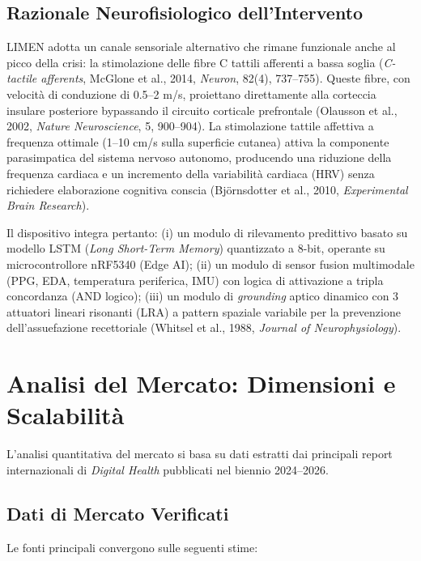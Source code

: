 \documentclass[12pt,a4paper]{article}
\begin{document}
\subsection{Razionale Neurofisiologico dell'Intervento}
LIMEN adotta un canale sensoriale alternativo che rimane funzionale anche al picco della crisi: la stimolazione delle fibre C tattili afferenti a bassa soglia (\textit{C-tactile afferents}, McGlone et al., 2014, \textit{Neuron}, 82(4), 737--755). Queste fibre, con velocità di conduzione di 0.5--2 m/s, proiettano direttamente alla corteccia insulare posteriore bypassando il circuito corticale prefrontale (Olausson et al., 2002, \textit{Nature Neuroscience}, 5, 900--904). La stimolazione tattile affettiva a frequenza ottimale (1--10 cm/s sulla superficie cutanea) attiva la componente parasimpatica del sistema nervoso autonomo, producendo una riduzione della frequenza cardiaca e un incremento della variabilità cardiaca (HRV) senza richiedere elaborazione cognitiva conscia (Bj\"{o}rnsdotter et al., 2010, \textit{Experimental Brain Research}).

Il dispositivo integra pertanto: (i) un modulo di rilevamento predittivo basato su modello LSTM (\textit{Long Short-Term Memory}) quantizzato a 8-bit, operante su microcontrollore nRF5340 (Edge AI); (ii) un modulo di sensor fusion multimodale (PPG, EDA, temperatura periferica, IMU) con logica di attivazione a tripla concordanza (AND logico); (iii) un modulo di \textit{grounding} aptico dinamico con 3 attuatori lineari risonanti (LRA) a pattern spaziale variabile per la prevenzione dell'assuefazione recettoriale (Whitsel et al., 1988, \textit{Journal of Neurophysiology}).

\section{Analisi del Mercato: Dimensioni e Scalabilità}
L'analisi quantitativa del mercato si basa su dati estratti dai principali report internazionali di \textit{Digital Health} pubblicati nel biennio 2024--2026.

\subsection{Dati di Mercato Verificati}
Le fonti principali convergono sulle seguenti stime:
\end{document}
